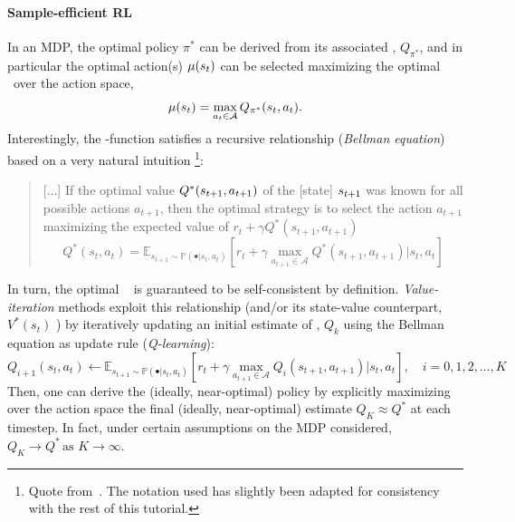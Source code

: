\paragraph{Sample-efficient RL}
In an MDP, the optimal policy \( \pi^* \) can be derived from its associated \qfunction, \( Q_{\pi^*} \), and in particular the optimal action(s) \(\mu(s_t)\) can be selected maximizing the optimal \qfunction \ over the action space,
\[
\mu(s_t) = \max_{a_t \in \mathcal A} Q_{\pi^*}(s_t, a_t).
\]
Interestingly, the \qopt-function satisfies a recursive relationship (\emph{Bellman equation}) based on a very natural intuition%
\footnote{Quote from~\citet{mnihPlayingAtariDeep2013}. The notation used has slightly been adapted for consistency with the rest of this tutorial.}:
\begin{quote}
    [...] If the optimal value \( Q^*(s_{t+1}, a_{t+1}) \) of the [state] \(s_{t+1} \) was known for all possible actions \(a_{t+1} \), then the optimal strategy is to select the action \( a_{t+1}\) maximizing the expected value of \( r_t + \gamma Q^*(s_{t+1}, a_{t+1}) \)
\[ 
Q^*(s_t, a_t) = \mathbb E_{s_{t+1} \sim \mathbb P(\bullet \vert s_t, a_t)} \left[ r_t + \gamma \max_{a_{t+1} \in \mathcal A} Q^*(s_{t+1}, a_{t+1}) \big\vert s_t, a_t  \right]
\]
\end{quote}

In turn, the optimal \qfunction \ %
is guaranteed to be self-consistent by definition.
\emph{Value-iteration} methods exploit this relationship (and/or its state-value counterpart, \( V^*(s_t) \) ) by iteratively updating an initial estimate of \qopt, \( Q_k \) using the Bellman equation as update rule (\emph{Q-learning}):
\[
    Q_{i+1}(s_t, a_t) \leftarrow \mathbb E_{s_{t+1} \sim \mathbb P(\bullet \vert s_t, a_t)} \left[ r_t + \gamma \max_{a_{t+1} \in \mathcal A} Q_i (s_{t+1}, a_{t+1}) \big\vert s_t, a_t  \right],  \quad i=0,1,2,\dots,K
\]
Then, one can derive the (ideally, near-optimal) policy by explicitly maximizing over the action space the final (ideally, near-optimal) estimate \( Q_K \approx Q^* \) at each timestep. 
In fact, under certain assumptions on the MDP considered, \( Q_K \to Q^* \, \text{as } K \to \infty \).

